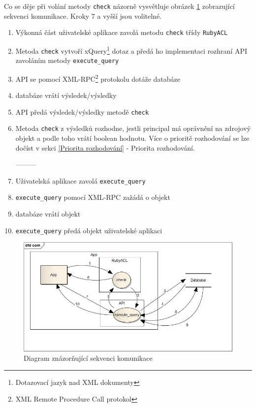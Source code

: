 Co se děje při volání metody \verb|check| názorně vysvětluje obrázek \ref{fig:Communication diagram} zobrazující sekvenci komunikace. Kroky 7 a vyšší jsou volitelné.
\begin{enumerate}
\item Výkonná část uživatelské aplikace zavolá metodu \verb|check| třídy \verb|RubyACL|
\item Metoda \verb|check| vytvoří xQuery\footnote{Dotazovací jazyk nad XML dokumenty} dotaz a předá ho implementaci rozhraní API zavoláním metody \verb|execute_query|
\item API se pomocí XML-RPC\footnote{XML Remote Procedure Call protokol} protokolu dotáže databáze
\item databáze vrátí výsledek/výsledky
\item API předá výsledek/výsledky metodě \verb|check|
\item Metoda \verb|check| z výsledků rozhodne, jestli principal má oprávnění na zdrojový objekt a podle toho vrátí boolean hodnotu. Více o prioritě rozhodování se lze dočíst v sekci \ref{Priorita rozhodování} - Priorita rozhodování.

---------

\item Uživatelská aplikace zavolá \verb|execute_query|
\item \verb|execute_query| pomocí XML-RPC zažádá o objekt
\item databáze vrátí objekt
\item \verb|execute_query| předá objekt uživatelské aplikaci
\end{enumerate}

\begin{figure}
\includegraphics[width=15cm]{com.jpg}
\caption{Diagram znázorňující sekvenci komunikace}
\label{fig:Communication diagram}
\end{figure}

